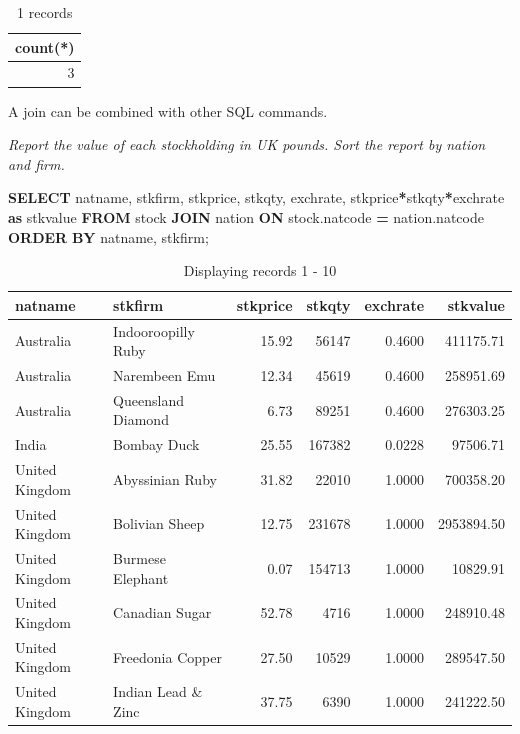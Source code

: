 \documentclass[
]{article}
\newenvironment{Shaded}{\begin{snugshade}}{\end{snugshade}}
\newcommand{\KeywordTok}[1]{\textcolor[rgb]{0.13,0.29,0.53}{\textbf{#1}}}
\newcommand{\NormalTok}[1]{#1}
\newcommand{\OperatorTok}[1]{\textcolor[rgb]{0.81,0.36,0.00}{\textbf{#1}}}
\begin{document}
\begin{table}

\caption{\label{tab:unnamed-chunk-41}1 records}
\centering
\begin{tabular}[t]{r}
\hline
count(*)\\
\hline
3\\
\hline
\end{tabular}
\end{table}

A join can be combined with other SQL commands.

\emph{Report the value of each stockholding in UK pounds. Sort the report by
nation and firm.}

\begin{Shaded}
\begin{Highlighting}[]
\KeywordTok{SELECT}\NormalTok{ natname, stkfirm, stkprice, stkqty, exchrate,}
\NormalTok{    stkprice}\OperatorTok{*}\NormalTok{stkqty}\OperatorTok{*}\NormalTok{exchrate }\KeywordTok{as}\NormalTok{ stkvalue}
        \KeywordTok{FROM}\NormalTok{ stock }\KeywordTok{JOIN}\NormalTok{ nation}
            \KeywordTok{ON}\NormalTok{ stock.natcode }\OperatorTok{=}\NormalTok{ nation.natcode}
                \KeywordTok{ORDER} \KeywordTok{BY}\NormalTok{ natname, stkfirm;}
\end{Highlighting}
\end{Shaded}

\begin{table}

\caption{\label{tab:unnamed-chunk-42}Displaying records 1 - 10}
\centering
\begin{tabular}[t]{l|l|r|r|r|r}
\hline
natname & stkfirm & stkprice & stkqty & exchrate & stkvalue\\
\hline
Australia & Indooroopilly Ruby & 15.92 & 56147 & 0.4600 & 411175.71\\
\hline
Australia & Narembeen Emu & 12.34 & 45619 & 0.4600 & 258951.69\\
\hline
Australia & Queensland Diamond & 6.73 & 89251 & 0.4600 & 276303.25\\
\hline
India & Bombay Duck & 25.55 & 167382 & 0.0228 & 97506.71\\
\hline
United Kingdom & Abyssinian Ruby & 31.82 & 22010 & 1.0000 & 700358.20\\
\hline
United Kingdom & Bolivian Sheep & 12.75 & 231678 & 1.0000 & 2953894.50\\
\hline
United Kingdom & Burmese Elephant & 0.07 & 154713 & 1.0000 & 10829.91\\
\hline
United Kingdom & Canadian Sugar & 52.78 & 4716 & 1.0000 & 248910.48\\
\hline
United Kingdom & Freedonia Copper & 27.50 & 10529 & 1.0000 & 289547.50\\
\hline
United Kingdom & Indian Lead \& Zinc & 37.75 & 6390 & 1.0000 & 241222.50\\
\hline
\end{tabular}
\end{table}
\end{document}
